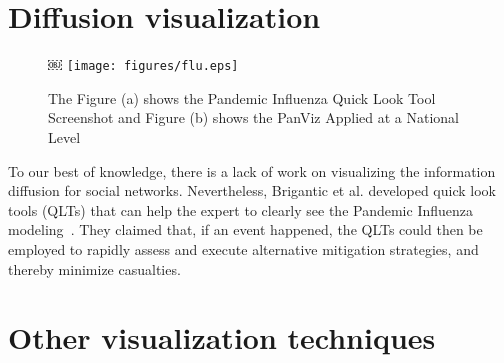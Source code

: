 \section{Diffusion visualization}

\begin{figure}[!htb]￼
  \centering
  \texttt{[image: figures/flu.eps]}
  \caption{The Figure (a) shows the Pandemic Influenza Quick Look Tool
    Screenshot and Figure (b) shows the PanViz Applied at a National Level~\cite{brigantic2010development}}
  \label{fig:flu}
\end{figure}


To our best of knowledge, there is a lack of work on visualizing the
information diffusion for social networks. Nevertheless, Brigantic et
al. developed quick look tools (QLTs)  that can help the expert to clearly
see the Pandemic Influenza
modeling~\cite{brigantic2010development}. They claimed that, if an event 
happened, the QLTs could then be employed to rapidly assess and execute alternative mitigation strategies, and 
thereby minimize casualties.
 
\section{Other visualization techniques}


